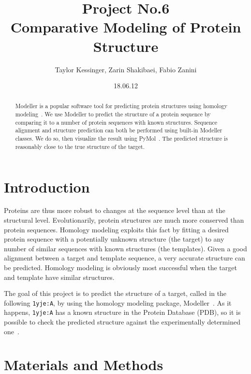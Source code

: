 \documentclass[notitlepage]{report}   %
\begin{document}
\title{Project No.6\\Comparative Modeling of Protein Structure}
\author{Taylor Kessinger, Zarin Shakibaei, Fabio Zanini}   
\date{18.06.12}
\maketitle

\begin{abstract}
 Modeller is a popular software tool for predicting protein structures using homology modeling~\cite{PROT:PROT340230306}. We use Modeller to predict the structure of a protein sequence by comparing it to a number of protein sequences with known structures. Sequence alignment and structure prediction can both be performed using built-in Modeller classes. We do so, then visualize the result using PyMol~\cite{pymol}. The predicted structure is reasonably close to the true structure of the target.
\end{abstract}

\section*{Introduction}   
Proteins are thus more robust to changes at the sequence level than at the structural level. Evolutionarily, protein structures are much more conserved than protein sequences. Homology modeling exploits this fact by fitting a desired protein sequence with a potentially unknown structure (the target) to any number of similar sequences with known structures (the templates). Given a good alignment between a target and template sequence, a very accurate structure can be predicted. Homology modeling is obviously most successful when the target and template have similar structures.

The goal of this project is to predict the structure of a target, called in the following \texttt{1yje:A}, by using the homology modeling package, Modeller~\cite{PROT:PROT340230306}. As it happens, \texttt{1yje:A} has a known structure in the Protein Database (PDB), so it is possible to check the predicted structure against the experimentally determined one~\cite{flaig1yje}.
 
\section*{Materials and Methods}   
\end{document}
